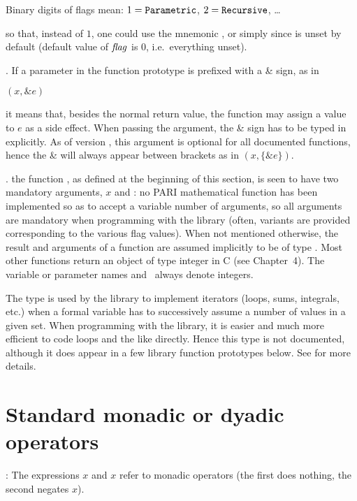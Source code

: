 \centerline{Binary digits of flags mean: $1={\tt Parametric}$,
$2={\tt Recursive}$, \dots}

\noindent so that, instead of $1$, one could use the mnemonic
, or simply  since
 is unset by default (default value of $\hbox{\it f\kern0pt lag\/}$ is $0$,
i.e.~everything unset).

. If a parameter in the function
prototype is prefixed with a \& sign, as in

$(x,\&e)$

\noindent it means that, besides the normal return value, the function may
assign a value to $e$ as a side effect. When passing the argument, the \&
sign has to be typed in explicitly. As of version \vers, this 
argument is optional for all documented functions, hence the \& will always
appear between brackets as in $(x,\{\&e\})$.

.
the  function , as defined
at the beginning of this section, is seen to have two mandatory arguments,
$x$ and \fl: no PARI mathematical function has been implemented so as to
accept a variable number of arguments, so all arguments are mandatory when
programming with the library (often, variants are provided corresponding to
the various flag values). When not mentioned otherwise, the result and
arguments of a function are assumed implicitly to be of type . Most
other functions return an object of type  integer in C (see
Chapter~4). The variable or parameter names  and \fl\ always denote
 integers.

The  type is used by the library to implement iterators (loops,
sums, integrals, etc.) when a formal variable has to successively assume a
number of values in a given set. When programming with the library, it is
easier and much more efficient to code loops and the like directly. Hence
this type is not documented, although it does appear in a few library
function prototypes below. See  for more details.

\section{Standard monadic or dyadic operators}

\subseckbd{+$/$-}: The expressions \kbd{+}$x$ and \kbd{-}$x$ refer
to monadic operators (the first does nothing, the second negates $x$).

